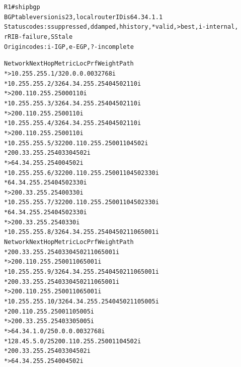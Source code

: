 \documentclass[12pt,twoside,a4paper]{report}
\begin{document}
\noindent
{\selectfont
\begin{small}
\begin{alltt}
R1#sh ip bgp              
BGP table version is 23, local router ID is 64.34.1.1
Status codes: s suppressed, d damped, h history, * valid, > best, i - internal,
              r RIB-failure, S Stale
Origin codes: i - IGP, e - EGP, ? - incomplete

   Network          Next Hop            Metric LocPrf Weight Path
*> 10.255.255.1/32  0.0.0.0                  0         32768 i
*  10.255.255.2/32  64.34.255.254                          0 4502 110 i
*>                  200.110.255.250          0             0 110 i
*  10.255.255.3/32  64.34.255.254                          0 4502 110 i
*>                  200.110.255.250                        0 110 i
*  10.255.255.4/32  64.34.255.254                          0 4502 110 i
*>                  200.110.255.250                        0 110 i
*  10.255.255.5/32  200.110.255.250                        0 110 4502 i
*                   200.33.255.254                         0 330 4502 i
*>                  64.34.255.254            0             0 4502 i
*  10.255.255.6/32  200.110.255.250                        0 110 4502 330 i
*                   64.34.255.254                          0 4502 330 i
*>                  200.33.255.254           0             0 330 i
*  10.255.255.7/32  200.110.255.250                        0 110 4502 330 i
*                   64.34.255.254                          0 4502 330 i
*>                  200.33.255.254                         0 330 i
*  10.255.255.8/32  64.34.255.254                          0 4502 110 65001 i
   Network          Next Hop            Metric LocPrf Weight Path
*                   200.33.255.254                         0 330 4502 110 65001 i
*>                  200.110.255.250                        0 110 65001 i
*  10.255.255.9/32  64.34.255.254                          0 4502 110 65001 i
*                   200.33.255.254                         0 330 4502 110 65001 i
*>                  200.110.255.250                        0 110 65001 i
*  10.255.255.10/32 64.34.255.254                          0 4502 110 5005 i
*                   200.110.255.250                        0 110 5005 i
*>                  200.33.255.254                         0 330 5005 i
*> 64.34.1.0/25     0.0.0.0                  0         32768 i
*  128.45.5.0/25    200.110.255.250                        0 110 4502 i
*                   200.33.255.254                         0 330 4502 i
*>                  64.34.255.254            0             0 4502 i

\end{alltt}
\end{small}}
\end{document}
